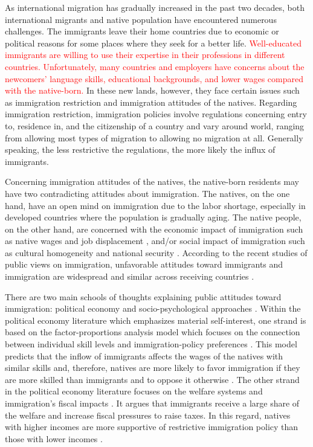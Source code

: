 \documentclass[12pt]{article}
\begin{document}
As international migration has gradually increased in the past two decades, both international migrants and native population have encountered numerous challenges. The immigrants leave their home countries due to economic or political reasons for some places where they seek for a better life. \textcolor{red}{Well-educated immigrants are willing to use their expertise in their professions in different countries. Unfortunately, many countries and employers have concerns about the newcomers' language skills, educational backgrounds, and lower wages compared with the native-born.} In these new lands, however, they face certain issues such as immigration restriction and immigration attitudes of the natives. Regarding immigration restriction, immigration policies involve regulations concerning entry to, residence in, and the citizenship of a country and vary around world, ranging from allowing most types of migration to allowing no migration at all. Generally speaking, the less restrictive the regulations, the more likely the influx of immigrants. 


Concerning immigration attitudes of the natives, the native-born residents may have two contradicting attitudes about immigration. The natives, on the one hand, have an open mind on immigration due to the labor shortage, especially in developed countries where the population is gradually aging. The native people, on the other hand, are concerned with the economic impact of immigration such as native wages and job displacement \citep{ScheveSlaughter2001}, and/or social impact of immigration such as cultural homogeneity \citep{Cardetal2012, CitrinSides2008} and national security \citep{LahavCourtemanche2012}. According to the recent studies of public views on immigration, unfavorable attitudes toward immigrants and immigration are widespread and similar across receiving countries \citep{CitrinSides2008, Zicketal2008}.


There are two main schools of thoughts explaining public attitudes toward immigration: political economy and socio-psychological approaches \citep{DustmannPreston2007, HainmuellerHopkins2014}. Within the political economy literature which emphasizes material self-interest, one strand is based on the factor-proportions analysis model which focuses on the connection between individual skill levels and immigration-policy preferences \citep{ScheveSlaughter2001}. This model predicts that the inflow of immigrants affects the wages of the natives with similar skills and, therefore, natives are more likely to favor immigration if they are more skilled than immigrants and to oppose it otherwise \citep{HainmuellerHiscox2007, Mayda2006}. The other strand in the political economy literature focuses on the welfare systems and immigration's fiscal impacts \citep{Borjas1999}. It argues that immigrants receive a large share of the welfare and increase fiscal pressures to raise taxes. In this regard, natives with higher incomes are more supportive of restrictive immigration policy than those with lower incomes \citep{DustmannPreston2006}.
\end{document}
